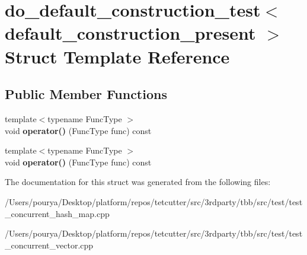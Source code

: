 \hypertarget{structdo__default__construction__test}{}\section{do\+\_\+default\+\_\+construction\+\_\+test$<$ default\+\_\+construction\+\_\+present $>$ Struct Template Reference}
\label{structdo__default__construction__test}
\subsection*{Public Member Functions}
\begin{DoxyCompactItemize}
\item 
\hypertarget{structdo__default__construction__test_a60972b9915bb2959689f40f17e773e77}{}{\footnotesize template$<$typename Func\+Type $>$ }\\void {\bfseries operator()} (Func\+Type func) const \label{structdo__default__construction__test_a60972b9915bb2959689f40f17e773e77}

\item 
\hypertarget{structdo__default__construction__test_a60972b9915bb2959689f40f17e773e77}{}{\footnotesize template$<$typename Func\+Type $>$ }\\void {\bfseries operator()} (Func\+Type func) const \label{structdo__default__construction__test_a60972b9915bb2959689f40f17e773e77}

\end{DoxyCompactItemize}


The documentation for this struct was generated from the following files\+:\begin{DoxyCompactItemize}
\item 
/\+Users/pourya/\+Desktop/platform/repos/tetcutter/src/3rdparty/tbb/src/test/test\+\_\+concurrent\+\_\+hash\+\_\+map.\+cpp\item 
/\+Users/pourya/\+Desktop/platform/repos/tetcutter/src/3rdparty/tbb/src/test/test\+\_\+concurrent\+\_\+vector.\+cpp\end{DoxyCompactItemize}
